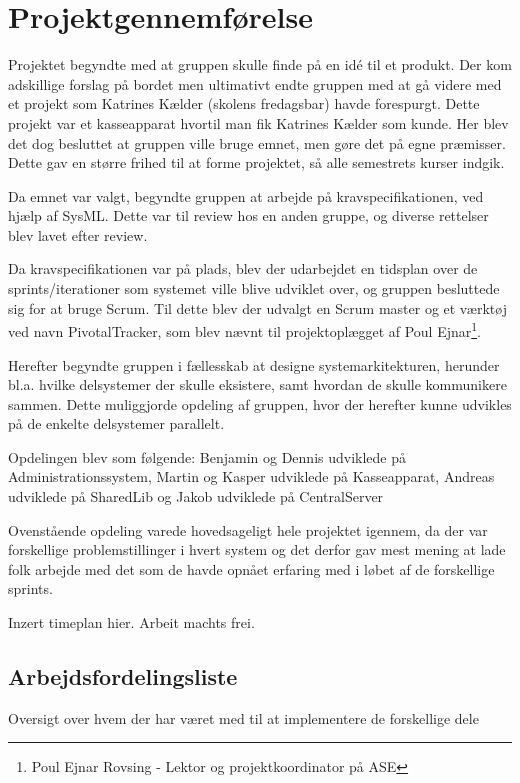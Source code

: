 \section{Projektgennemførelse}
Projektet begyndte med at gruppen skulle finde på en idé til et produkt. Der kom adskillige forslag på bordet men ultimativt endte gruppen med at gå videre med et projekt som Katrines Kælder (skolens fredagsbar) havde forespurgt. Dette projekt var et kasseapparat hvortil man fik Katrines Kælder som kunde. Her blev det dog besluttet at gruppen ville bruge emnet, men gøre det på egne præmisser. Dette gav en større frihed til at forme projektet, så alle semestrets kurser indgik.

Da emnet var valgt, begyndte gruppen at arbejde på kravspecifikationen, ved hjælp af SysML. Dette var til review hos en anden gruppe, og diverse rettelser blev lavet efter review.

Da kravspecifikationen var på plads, blev der udarbejdet en tidsplan over de sprints/iterationer som systemet ville blive udviklet over, og gruppen besluttede sig for at bruge Scrum. Til dette blev der udvalgt en Scrum master og et værktøj ved navn PivotalTracker, som blev nævnt til projektoplægget af Poul Ejnar\footnote{Poul Ejnar Rovsing - Lektor og projektkoordinator på ASE}.

Herefter begyndte gruppen i fællesskab at designe systemarkitekturen, herunder bl.a. hvilke delsystemer der skulle eksistere, samt hvordan de skulle kommunikere sammen. Dette muliggjorde opdeling af gruppen, hvor der herefter kunne udvikles på de enkelte delsystemer parallelt.

Opdelingen blev som følgende: Benjamin og Dennis udviklede på Administrationssystem, Martin og Kasper udviklede på Kasseapparat, Andreas udviklede på SharedLib og Jakob udviklede på CentralServer

Ovenstående opdeling varede hovedsageligt hele projektet igennem, da der var forskellige problemstillinger i hvert system og det derfor gav mest mening at lade folk arbejde med det som de havde opnået erfaring med i løbet af de forskellige sprints.

Inzert timeplan hier. Arbeit machts frei.

\newpage
\subsection{Arbejdsfordelingsliste}

Oversigt over hvem der har været med til at implementere de forskellige dele

